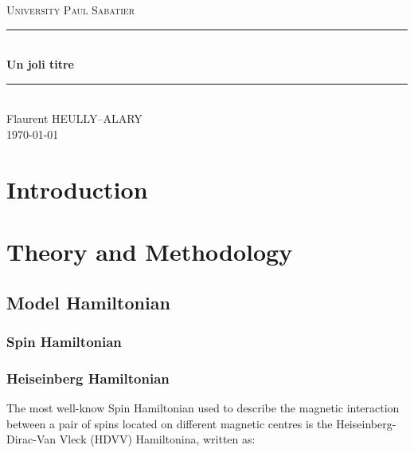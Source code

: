 \documentclass[10pt]{report}
\numberwithin{equation}{section}
\newcommand{\noun}[1]{\textsc{#1}}
\begin{document}

\begin{titlepage}
\newcommand{\HRule}{\rule{\linewidth}{0.5mm}}
\center
\textsc{\LARGE
University \noun{Paul Sabatier}
} \\[1cm]
\HRule\\[0.4cm]
{ \huge \bfseries Un joli titre \\[0.15cm] }
\HRule\\[1.5cm]
Flaurent HEULLY--ALARY
\\[1cm]
\today \\ [1cm]
\end{titlepage}
\begin{center}
\thispagestyle{plain}
\par\end{center}
\large
\tableofcontents
\newpage
\chapter{Introduction}

\chapter{Theory and Methodology}

\section{Model Hamiltonian}

\subsection{Spin Hamiltonian}

\subsection*{Heiseinberg Hamiltonian}
The most well-know Spin Hamiltonian used to describe the magnetic interaction between a pair of spins located on different magnetic centres is the Heiseinberg-Dirac-Van Vleck (HDVV) Hamiltonina, written as:
\end{document}
